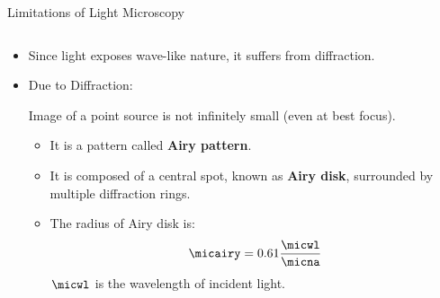 \begin{frame}{Limitations of Light Microscopy}
	\begin{columns}[c,onlytextwidth]

		\begin{column}{0.6\textwidth}
			\begin{itemize}
				\item<1-> Since light exposes wave-like nature, it suffers from diffraction.
				\item<2-> Due to Diffraction:

				      Image of a point source is not infinitely small (even at best focus).
				      \begin{itemize}
					      \item<3-> It is a pattern called \textbf{Airy pattern}.
					      \item<4-> It is composed of a central spot, known as \textbf{Airy disk}, surrounded by multiple diffraction rings.
					      \item<5-> The radius of Airy disk is:
					            \begin{equation*}\label{eq:mic:airy}
						            \micairy = 0.61\frac{\micwl}{\micna}
					            \end{equation*}
					            $\micwl$ is the wavelength of incident light.
				      \end{itemize}
			\end{itemize}
		\end{column}
\end{columns}
\end{frame}
